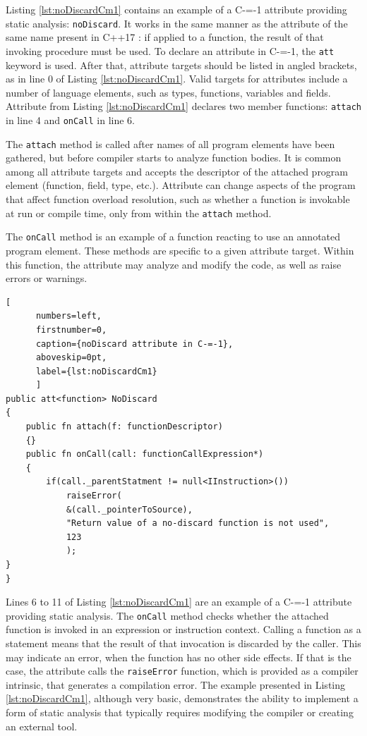 Listing \ref{lst:noDiscardCm1} contains an example of a C-=-1 attribute providing static analysis: \lstinline{noDiscard}.
It works in the same manner as the attribute of the same name present in C++17 \cite{ISO:cpp17}: if applied to a function, the result of that invoking procedure must be used.
To declare an attribute in C-=-1, the \lstinline{att} keyword is used.
After that, attribute targets should be listed in angled brackets, as in line 0 of Listing \ref{lst:noDiscardCm1}.
Valid targets for attributes include a number of language elements, such as types, functions, variables and fields. Attribute from Listing \ref{lst:noDiscardCm1} declares two member functions: \lstinline{attach} in line 4 and \lstinline{onCall} in line 6.

The \lstinline{attach} method is called after names of all program elements have been gathered, but before compiler starts to analyze function bodies.
It is common among all attribute targets and accepts the descriptor of the attached program element (function, field, type, etc.).
Attribute can change aspects of the program that affect function overload resolution, such as  whether a function is invokable at run or compile time, only from within the \lstinline{attach} method.

The \lstinline{onCall} method is an example of a function reacting to use an annotated program element.
These methods are specific to a given attribute target.
Within this function, the attribute may analyze and modify the code, as well as raise errors or warnings.

\begin{minipage}{\linewidth}

	\begin{lstlisting}[
	  numbers=left,
	  firstnumber=0,
	  caption={noDiscard attribute in C-=-1},
	  aboveskip=0pt,
	  label={lst:noDiscardCm1}
	  ]
public att<function> NoDiscard
{
	public fn attach(f: functionDescriptor)
	{}
	public fn onCall(call: functionCallExpression*)
	{
		if(call._parentStatment != null<IInstruction>())
			raiseError(
			&(call._pointerToSource),
			"Return value of a no-discard function is not used",
			123
			);
}
}
  \end{lstlisting}
\end{minipage}



Lines 6 to 11 of Listing \ref{lst:noDiscardCm1} are an example of a C-=-1 attribute providing static analysis.
The \lstinline{onCall} method checks whether the attached function is invoked in an expression or instruction context.
Calling a function as a statement means that the result of that invocation is discarded by the caller.
This may indicate an error, when the function has no other side effects.
If that is the case, the attribute calls the \lstinline{raiseError} function, which is provided as a compiler intrinsic, that generates a compilation error.
The example presented in Listing \ref{lst:noDiscardCm1}, although very basic, demonstrates the ability to implement a form of static analysis that typically requires modifying the compiler or creating an external tool.

